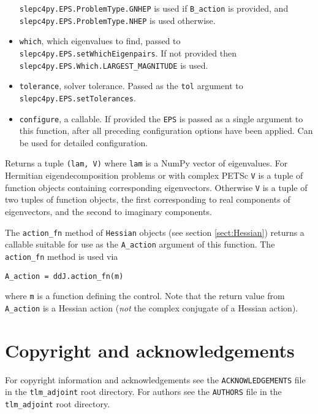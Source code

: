 \documentclass[11pt]{article}
\begin{document}
\begin{itemize}
    \texttt{slepc4py.EPS.ProblemType.GNHEP} is used if \texttt{B\_action} is
    provided, and \texttt{slepc4py.EPS.ProblemType.NHEP} is used otherwise.
  \item \texttt{which}, which eigenvalues to find, passed to
    \texttt{slepc4py.EPS.setWhichEigenpairs}. If not provided then
    \texttt{slepc4py.EPS.Which.LARGEST\_MAGNITUDE} is used.
  \item \texttt{tolerance}, solver tolerance. Passed as the \texttt{tol}
   argument to \texttt{slepc4py.EPS.setTolerances}.
  \item \texttt{configure}, a callable. If provided the \texttt{EPS} is passed
    as a single argument to this function, after all preceding configuration
    options have been applied. Can be used for detailed configuration.
\end{itemize}

Returns a tuple \texttt{(lam, V)} where \texttt{lam} is a NumPy vector of
eigenvalues. For Hermitian eigendecomposition problems or with complex PETSc
\texttt{V} is a tuple of function objects containing corresponding
eigenvectors. Otherwise \texttt{V} is a tuple of two tuples of function
objects, the first corresponding to real components of eigenvectors, and the
second to imaginary components.

The \texttt{action\_fn} method of \texttt{Hessian} objects (see section
\ref{sect:Hessian}) returns a callable suitable for use as the
\texttt{A\_action} argument of this function. The \texttt{action\_fn} method is
used via
\begin{lstlisting}
A_action = ddJ.action_fn(m)
\end{lstlisting}
where \texttt{m} is a function defining the control. Note that the return
value from \texttt{A\_action} is a Hessian action (\emph{not} the complex
conjugate of a Hessian action).

\section{Copyright and acknowledgements}

For copyright information and acknowledgements see the
\texttt{ACKNOWLEDGEMENTS} file in the \texttt{tlm\_adjoint} root directory. For
authors see the \texttt{AUTHORS} file in the \texttt{tlm\_adjoint} root
directory.



\end{document}
